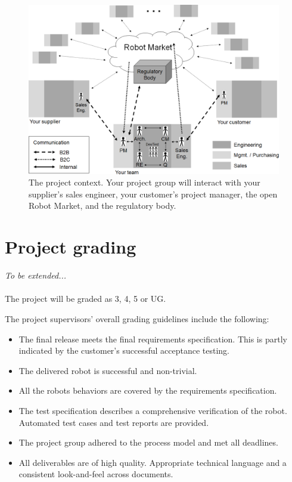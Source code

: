 \documentclass{scrreprt}
\begin{document}
\begin{figure}
\centering
\includegraphics[width=0.99\textwidth]{figures/projectContext.png}
\caption{The project context. Your project group will interact with your supplier's sales engineer, your customer's project manager, the open Robot Market, and the regulatory body.}
\label{fig:context}
\end{figure}

\section{Project grading}
\textit{To be extended...}\\\\
The project will be graded as 3, 4, 5 or UG.

The project supervisors' overall grading guidelines include the following:
\begin{itemize}
\item The final release meets the final requirements specification. This is partly indicated by the customer's successful acceptance testing.
\item The delivered robot is successful and non-trivial.
\item All the robots behaviors are covered by the requirements specification.
\item The test specification describes a comprehensive verification of the robot. Automated test cases and test reports are provided.
\item The project group adhered to the process model and met all deadlines.
\item All deliverables are of high quality. Appropriate technical language and a consistent look-and-feel across documents.
\end{itemize}
\end{document}
